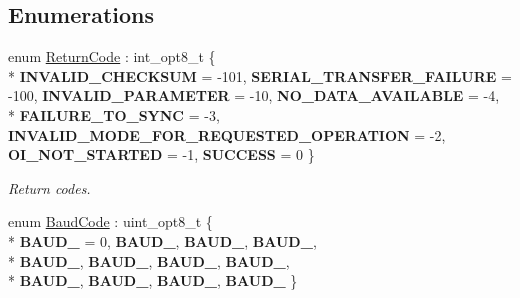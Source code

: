 \subsection*{Enumerations}
\begin{DoxyCompactItemize}
\item 
\hypertarget{namespaceroomba_aff53babe0af88b1ea8b066fd18b8f23f}{enum \hyperlink{namespaceroomba_aff53babe0af88b1ea8b066fd18b8f23f}{Return\+Code} \+: int\+\_\+opt8\+\_\+t \{ \\*
{\bfseries I\+N\+V\+A\+L\+I\+D\+\_\+\+C\+H\+E\+C\+K\+S\+U\+M} = -\/101, 
{\bfseries S\+E\+R\+I\+A\+L\+\_\+\+T\+R\+A\+N\+S\+F\+E\+R\+\_\+\+F\+A\+I\+L\+U\+R\+E} = -\/100, 
{\bfseries I\+N\+V\+A\+L\+I\+D\+\_\+\+P\+A\+R\+A\+M\+E\+T\+E\+R} = -\/10, 
{\bfseries N\+O\+\_\+\+D\+A\+T\+A\+\_\+\+A\+V\+A\+I\+L\+A\+B\+L\+E} = -\/4, 
\\*
{\bfseries F\+A\+I\+L\+U\+R\+E\+\_\+\+T\+O\+\_\+\+S\+Y\+N\+C} = -\/3, 
{\bfseries I\+N\+V\+A\+L\+I\+D\+\_\+\+M\+O\+D\+E\+\_\+\+F\+O\+R\+\_\+\+R\+E\+Q\+U\+E\+S\+T\+E\+D\+\_\+\+O\+P\+E\+R\+A\+T\+I\+O\+N} = -\/2, 
{\bfseries O\+I\+\_\+\+N\+O\+T\+\_\+\+S\+T\+A\+R\+T\+E\+D} = -\/1, 
{\bfseries S\+U\+C\+C\+E\+S\+S} = 0
 \}}\label{namespaceroomba_aff53babe0af88b1ea8b066fd18b8f23f}

\begin{DoxyCompactList}\small\item\em Return codes. \end{DoxyCompactList}\item 
\hypertarget{namespaceroomba_a303ba447b12fc77bc24977a1a7ec6d6c}{enum \hyperlink{namespaceroomba_a303ba447b12fc77bc24977a1a7ec6d6c}{Baud\+Code} \+: uint\+\_\+opt8\+\_\+t \{ \\*
{\bfseries B\+A\+U\+D\+\_} = 0, 
{\bfseries B\+A\+U\+D\+\_}, 
{\bfseries B\+A\+U\+D\+\_}, 
{\bfseries B\+A\+U\+D\+\_}, 
\\*
{\bfseries B\+A\+U\+D\+\_}, 
{\bfseries B\+A\+U\+D\+\_}, 
{\bfseries B\+A\+U\+D\+\_}, 
{\bfseries B\+A\+U\+D\+\_}, 
\\*
{\bfseries B\+A\+U\+D\+\_}, 
{\bfseries B\+A\+U\+D\+\_}, 
{\bfseries B\+A\+U\+D\+\_}, 
{\bfseries B\+A\+U\+D\+\_}
 \}}\label{namespaceroomba_a303ba447b12fc77bc24977a1a7ec6d6c}


\end{DoxyCompactItemize}
